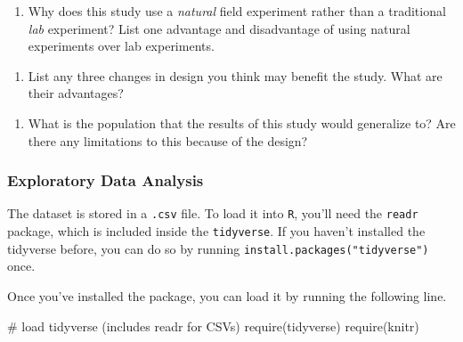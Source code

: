 \documentclass[
  letterpaper,
  DIV=11,
  numbers=noendperiod]{scrartcl}
\newenvironment{Shaded}{\begin{snugshade}}{\end{snugshade}}
\newcommand{\CommentTok}[1]{\textcolor[rgb]{0.37,0.37,0.37}{#1}}
\newcommand{\FunctionTok}[1]{\textcolor[rgb]{0.28,0.35,0.67}{#1}}
\newcommand{\NormalTok}[1]{\textcolor[rgb]{0.00,0.23,0.31}{#1}}
\providecommand{\tightlist}{%
  \setlength{\itemsep}{0pt}\setlength{\parskip}{0pt}}
\begin{document}
\hfill\break
\hfill\break
\hfill\break
\hfill\break
\hfill\break

\begin{enumerate}
\def\labelenumi{\arabic{enumi}.}
\setcounter{enumi}{2}
\tightlist
\item
  Why does this study use a \emph{natural} field experiment rather than
  a traditional \emph{lab} experiment? List one advantage and
  disadvantage of using natural experiments over lab experiments.\\
\end{enumerate}

\hfill\break
\hfill\break
\hfill\break
\hfill\break
\hfill\break
\hfill\break

\begin{enumerate}
\def\labelenumi{\arabic{enumi}.}
\setcounter{enumi}{3}
\tightlist
\item
  List any three changes in design you think may benefit the study. What
  are their advantages?
\end{enumerate}

\hfill\break
\hfill\break
\hfill\break
\hfill\break
\hfill\break
\hfill\break
\hfill\break
\hfill\break
\hfill\break

\begin{enumerate}
\def\labelenumi{\arabic{enumi}.}
\setcounter{enumi}{4}
\tightlist
\item
  What is the population that the results of this study would generalize
  to? Are there any limitations to this because of the design?
\end{enumerate}

\hfill\break
\hfill\break
\hfill\break
\hfill\break

\newpage{}

\subsubsection{Exploratory Data
Analysis}\label{exploratory-data-analysis}

The dataset is stored in a \texttt{.csv} file. To load it into
\texttt{R}, you'll need the \texttt{readr} package, which is included
inside the \texttt{tidyverse}. If you haven't installed the tidyverse
before, you can do so by running \texttt{install.packages("tidyverse")}
once.

Once you've installed the package, you can load it by running the
following line.

\begin{Shaded}
\begin{Highlighting}[]
\CommentTok{\# load tidyverse (includes readr for CSVs)}
\FunctionTok{require}\NormalTok{(tidyverse)}
\FunctionTok{require}\NormalTok{(knitr)}
\end{Highlighting}
\end{Shaded}
\end{document}
